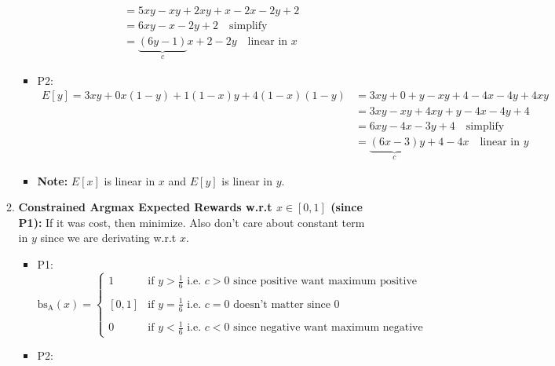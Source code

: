 \begin{example}
\begin{enumerate}
\begin{enumerate}
\begin{itemize}
\begin{align*}
                    &= 5xy - xy + 2xy + x - 2x - 2y + 2 \\
                    &= 6xy - x - 2y + 2 \quad \text{simplify} \\
                    &= \underbrace{(6y - 1)}_{c}x + 2 - 2y \quad \text{linear in $x$} 
                \end{align*}
                \item P2:
                \begin{align*}
                    E[y] = 3xy + 0x(1-y) + 1(1-x)y + 4(1-x)(1-y) &= 3xy + 0 + y - xy + 4 - 4x - 4y + 4xy \\
                    &= 3xy - xy + 4xy + y - 4x - 4y + 4 \\
                    &= 6xy - 4x - 3y + 4 \quad \text{simplify} \\
                    &= \underbrace{(6x - 3)}_{c}y + 4 - 4x \quad \text{linear in $y$}
                \end{align*}
                \item \textbf{Note:} $E[x]$ is linear in $x$ and $E[y]$ is linear in $y$.
            \end{itemize}
            \item \textbf{Constrained Argmax Expected Rewards w.r.t $x \in [0,1]$ (since P1):} If it was cost, then minimize. Also don't care about constant term in $y$ since we are derivating w.r.t $x$.
            \begin{itemize}
                \item P1: 
                \begin{equation*}
                    \text{bs}_{\text{A}}(x) = \begin{cases}
                        1 & \text{if } y > \frac{1}{6} \text{ i.e. } c > 0 \text{ since positive want maximum positive}\\
                        & \\
                        [0,1] & \text{if } y=\frac{1}{6} \text{ i.e. }c = 0 \text{ doesn't matter since 0} \\
                        & \\
                        0 & \text{if } y < \frac{1}{6} \text{ i.e. } c < 0 \text{ since negative want maximum negative}
                    \end{cases}
                \end{equation*}
                \item P2:
                \begin{equation*}

\end{equation*}
\end{itemize}
\end{enumerate}
\end{enumerate}
\end{example}
